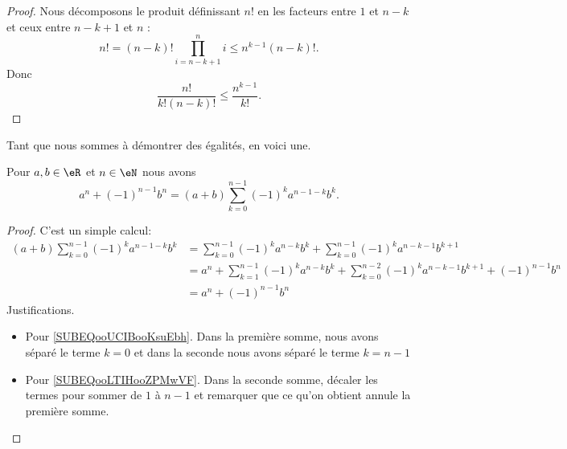 \begin{proof}
	Nous décomposons le produit définissant \( n!\) en les facteurs entre \( 1\) et \( n-k\) et ceux entre \( n-k+1\) et \( n\) :
	\begin{equation}
		n!=(n-k)!\prod_{i=n-k+1}^ni\leq n^{k-1}(n-k)!.
	\end{equation}
	Donc
	\begin{equation}
		\frac{ n! }{ k!(n-k)! }\leq \frac{ n^{k-1} }{ k! }.
	\end{equation}
\end{proof}

Tant que nous sommes à démontrer des égalités, en voici une.

\begin{lemma}     \label{LEMooLPOQooICJYdV}
	Pour \( a,b\in \eR\) et \( n\in \eN\) nous avons
	\begin{equation}
		a^n+(-1)^{n-1}b^n=(a+b)\sum_{k=0}^{n-1}(-1)^ka^{n-1-k}b^k.
	\end{equation}
\end{lemma}

\begin{proof}
	C'est un simple calcul:
	\begin{subequations}
		\begin{align}
			(a+b)\sum_{k=0}^{n-1}(-1)^ka^{n-1-k}b^k & =  \sum_{k=0}^{n-1}(-1)^ka^{n-k}b^k+\sum_{k=0}^{n-1}(-1)^ka^{n-k-1}b^{k+1}                                                 \\
			                                        & = a^n+\sum_{k=1}^{n-1}(-1)^ka^{n-k}b^k+\sum_{k=0}^{n-2}(-1)^ka^{n-k-1}b^{k+1} +(-1)^{n-1}b^n   \label{SUBEQooUCIBooKsuEbh} \\
			                                        & = a^n+(-1)^{n-1}b^n                                            \label{SUBEQooLTIHooZPMwVF}
		\end{align}
	\end{subequations}
	Justifications.
	\begin{itemize}
		\item Pour \eqref{SUBEQooUCIBooKsuEbh}. Dans la première somme, nous avons séparé le terme \( k=0\) et dans la seconde nous avons séparé le terme \( k=n-1\)
		\item Pour \eqref{SUBEQooLTIHooZPMwVF}. Dans la seconde somme, décaler les termes pour sommer de \( 1\) à \( n-1\) et remarquer que ce qu'on obtient annule la première somme.
	\end{itemize}
\end{proof}

